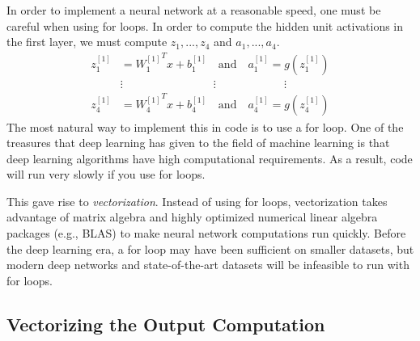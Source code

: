 \documentclass{article}
\numberwithin{equation}{section}
\begin{document}
In order to implement a neural network at a reasonable speed, one must be careful when using for loops. In order to compute the hidden unit activations in the first layer, we must compute $z_1, ..., z_4$ and $a_1,..., a_4$.
\begin{align}
z_1^{[1]} & = {W^{[1]}_1}^T x + b^{[1]}_1 \quad\textrm{and}\quad a_1^{[1]} = g(z_1^{[1]}) \\
& \vdots \qquad \qquad \qquad \qquad \vdots \qquad \qquad \qquad \vdots \\
z_4^{[1]} & = {W^{[1]}_4}^T x + b^{[1]}_4 \quad\textrm{and}\quad a_4^{[1]} = g(z_4^{[1]})
\end{align}
The most natural way to implement this in code is to use a for loop. One of the treasures that deep learning has given to the field of machine learning is that deep learning algorithms have high computational requirements. As a result, code will run very slowly if you use for loops.

This gave rise to \textit{vectorization}. Instead of using for loops, vectorization takes advantage of matrix algebra and highly optimized numerical linear algebra packages (e.g., BLAS) to make neural network computations run quickly. Before the deep learning era, a for loop may have been sufficient on smaller datasets, but modern deep networks and state-of-the-art datasets will be infeasible to run with for loops.

\subsection{Vectorizing the Output Computation}
\end{document}
